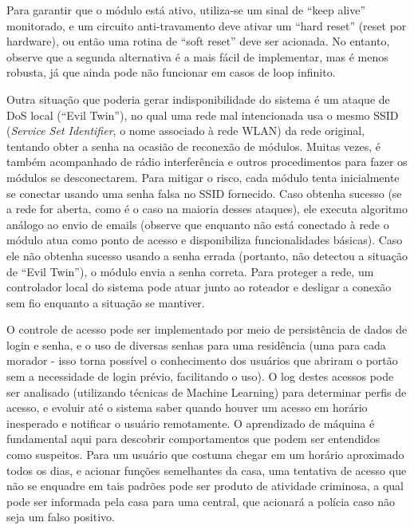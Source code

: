 Para garantir que o módulo está ativo, utiliza-se um sinal de “keep alive” monitorado, e um circuito anti-travamento deve ativar um “hard reset” (reset por hardware), ou então uma rotina de “soft reset” deve ser acionada. No entanto, observe que a segunda alternativa é a mais fácil de implementar, mas é menos robusta, já que ainda pode não funcionar em casos de loop infinito.

Outra situação que poderia gerar indisponibilidade do sistema é um ataque de DoS local (“Evil Twin”), no qual uma rede mal intencionada usa o mesmo SSID (\textit{Service Set Identifier}, o nome associado à rede WLAN) da rede original, tentando obter a senha na ocasião de reconexão de módulos. Muitas vezes, é também acompanhado de rádio interferência e outros procedimentos para fazer os módulos se desconectarem. Para mitigar o risco, cada módulo tenta inicialmente se conectar usando uma senha falsa no SSID fornecido. Caso obtenha sucesso (se a rede for aberta, como é o caso na maioria desses ataques), ele executa algoritmo análogo ao envio de emails (observe que enquanto não está conectado à rede o módulo atua como ponto de acesso e disponibiliza funcionalidades básicas). Caso ele não obtenha sucesso usando a senha errada (portanto, não detectou a situação de “Evil Twin”), o módulo envia a senha correta. Para proteger a rede, um controlador local do sistema pode atuar junto ao roteador e desligar a conexão sem fio enquanto a situação se mantiver.

O controle de acesso pode ser implementado por meio de persistência de dados de login e senha, e o uso de diversas senhas para uma residência (uma para cada morador - isso torna possível o conhecimento dos usuários que abriram o portão sem a necessidade de login prévio, facilitando o uso). O log destes acessos pode ser analisado (utilizando técnicas de Machine Learning) para determinar perfis de acesso, e evoluir até o sistema saber quando houver um acesso em horário inesperado e notificar o usuário remotamente. O aprendizado de máquina é fundamental aqui para descobrir comportamentos que podem ser entendidos como suspeitos. Para um usuário que costuma chegar em um horário aproximado todos os dias, e acionar funções semelhantes da casa, uma tentativa de acesso que não se enquadre em tais padrões pode ser produto de atividade criminosa, a qual pode ser informada pela casa para uma central, que acionará a polícia caso não seja um falso positivo.
